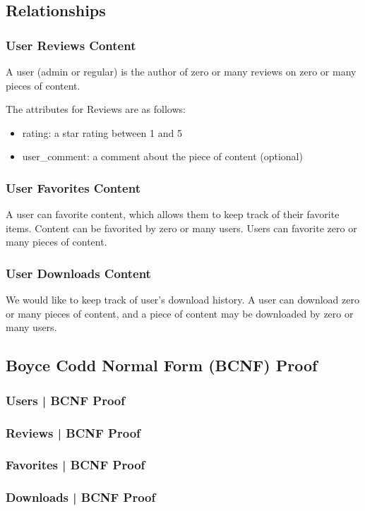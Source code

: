 \documentclass[letter, 12pt, titlepage]{article}
\begin{document}
	\subsection{Relationships}
		\subsubsection{User Reviews Content}
			A user (admin or regular) is the author of zero or many reviews on zero or many pieces of content. 

			The attributes for Reviews are as follows:
			\begin{itemize}
				\item rating: a star rating between 1 and 5
				\item user\_comment: a comment about the piece of content (optional)
			\end{itemize}
		\subsubsection{User Favorites Content}
			A user can favorite content, which allows them to keep track of their favorite items. Content can be favorited by zero or many users. Users can favorite zero or many pieces of content.	
		\subsubsection{User Downloads Content}
			We would like to keep track of user's download history. A user can download zero or many pieces of content, and a piece of content may be downloaded by zero or many users.

\subsection{Boyce Codd Normal Form (BCNF) Proof}
		\subsubsection{Users | BCNF Proof }
		\subsubsection{Reviews | BCNF Proof }
		\subsubsection{Favorites | BCNF Proof }
		\subsubsection{Downloads | BCNF Proof }
\end{document}
